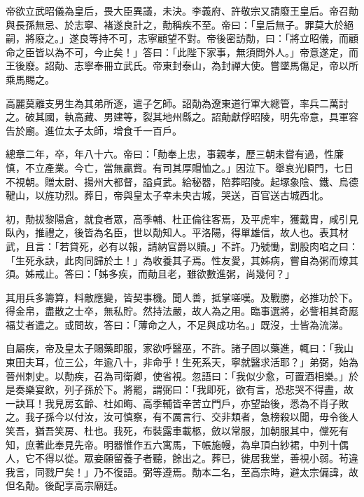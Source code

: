 \begin{pinyinscope}
 帝欲立武昭儀為皇后，畏大臣異議，未決。李義府、許敬宗又請廢王皇后。帝召勣與長孫無忌、於志寧、褚遂良計之，勣稱疾不至。帝曰：「皇后無子。罪莫大於絕嗣，將廢之。」遂良等持不可，志寧顧望不對。帝後密訪勣，曰：「將立昭儀，而顧命之臣皆以為不可，今止矣！」答曰：「此陛下家事，無須問外人。」帝意遂定，而王後廢。詔勣、志寧奉冊立武氏。帝東封泰山，為封禪大使。嘗墜馬傷足，帝以所乘馬賜之。



 高麗莫離支男生為其弟所逐，遣子乞師。詔勣為遼東道行軍大總管，率兵二萬討之。破其國，執高藏、男建等，裂其地州縣之。詔勣獻俘昭陵，明先帝意，具軍容告於廟。進位太子太師，增食千一百戶。



 總章二年，卒，年八十六。帝曰：「勣奉上忠，事親孝，歷三朝未嘗有過，性廉慎，不立產業。今亡，當無贏貲。有司其厚賵恤之。」因泣下。舉哀光順門，七日不視朝。贈太尉、揚州大都督，謚貞武。給秘器，陪葬昭陵。起塚象陰、鐵、烏德鞬山，以旌功烈。葬日，帝與皇太子幸未央古城，哭送，百官送古城西北。



 初，勣拔黎陽倉，就食者眾，高季輔、杜正倫往客焉，及平虎牢，獲戴胄，咸引見臥內，推禮之，後皆為名臣，世以勣知人。平洛陽，得單雄信，故人也。表其材武，且言：「若貸死，必有以報，請納官爵以贖。」不許。乃號慟，割股肉啗之曰：「生死永訣，此肉同歸於土！」為收養其子焉。性友愛，其姊病，嘗自為粥而燎其須。姊戒止。答曰：「姊多疾，而勣且老，雖欲數進粥，尚幾何？」



 其用兵多籌算，料敵應變，皆契事機。聞人善，抵掌嗟嘆。及戰勝，必推功於下。得金帛，盡散之士卒，無私貯。然持法嚴，故人為之用。臨事選將，必訾相其奇厖福艾者遣之。或問故，答曰：「薄命之人，不足與成功名。」既沒，士皆為流涕。



 自屬疾，帝及皇太子賜藥即服，家欲呼醫巫，不許。諸子固以藥進，輒曰：「我山東田夫耳，位三公，年逾八十，非命乎！生死系天，寧就醫求活耶？」弟弼，始為晉州刺史。以勣疾，召為司衛卿，使省視。忽語曰：「我似少愈，可置酒相樂。」於是奏樂宴飲，列子孫於下。將罷，謂弼曰：「我即死，欲有言，恐悲哭不得盡，故一訣耳！我見房玄齡、杜如晦、高季輔皆辛苦立門戶，亦望詒後，悉為不肖子敗之。我子孫今以付汝，汝可慎察，有不厲言行、交非類者，急榜殺以聞，毋令後人笑吾，猶吾笑房、杜也。我死，布裝露車載柩，斂以常服，加朝服其中，儻死有知，庶著此奉見先帝。明器惟作五六寓馬，下帳施幔，為皁頂白紗裙，中列十偶人，它不得以從。眾妾願留養子者聽，餘出之。葬已，徙居我堂，善視小弱。茍違我言，同戮尸矣！」乃不復語。弼等遵焉。勣本二名，至高宗時，避太宗偏諱，故但名勣。後配享高宗廟廷。




\end{pinyinscope}
